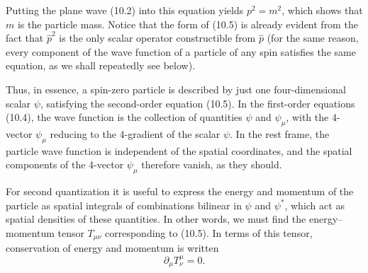 Putting the plane wave (10.2) into this equation yields $p^2=m^2$, which shows that $m$ is the particle mass. Notice that the form of (10.5) is already evident from the fact that $\widehat p^2$ is the only scalar operator constructible from $\widehat p$ (for the same reason, every component of the wave function of a particle of any spin satisfies the same equation, as we shall repeatedly see below).

Thus, in essence, a spin-zero particle is described by just one four-dimensional scalar $\psi$, satisfying the second-order equation (10.5). In the first-order equations (10.4), the wave function is the collection of quantities $\psi$ and $\psi_\mu$, with the 4-vector $\psi_\mu$ reducing to the 4-gradient of the scalar $\psi$. In the rest frame, the particle wave function is independent of the spatial coordinates, and the spatial components of the 4-vector $\psi_\mu$ therefore vanish, as they should.

For second quantization it is useful to express the energy and momentum of the particle as spatial integrals of combinations bilinear in $\psi$ and $\psi^*$, which act as spatial densities of these quantities. In other words, we must find the energy--momentum tensor $T_{\mu\nu}$ corresponding to (10.5). In terms of this tensor, conservation of energy and momentum is written
\begin{equation}
\partial_\mu T^\mu_{\nu}=0.
\tag{10.7}
\end{equation}

